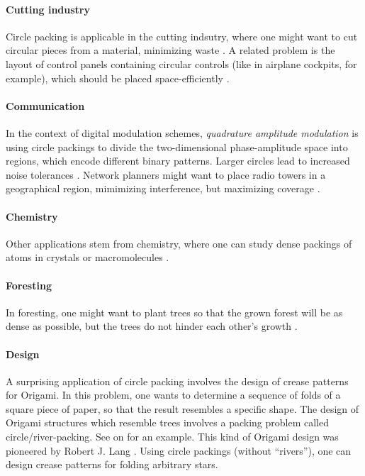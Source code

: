 \documentclass[a4paper,style=print,bibliography=totoc,nexus,lnum,extramargin]{tubsbook}
\begin{document}
\paragraph{Cutting industry}

Circle packing is applicable in the cutting indsutry, where one might want to cut circular pieces from a material, minimizing waste \cite{SMCSCG2007new}.
A related problem is the layout of control panels containing circular controls (like in airplane cockpits, for example), which should be placed space-efficiently \parencite{CKP2008solving}.

\paragraph{Communication}

In the context of digital modulation schemes, \emph{quadrature amplitude modulation} is using circle packings to divide the two-dimensional phase-amplitude space into regions, which encode different binary patterns. Larger circles lead to increased noise tolerances \parencite{PWMD1992packing}.
Network planners might want to place radio towers in a geographical region, mimimizing interference, but maximizing coverage \parencite{SMCSCG2007new}.

\paragraph{Chemistry}

Other applications stem from chemistry, where one can study dense packings of atoms in crystals or macromolecules \cite{WMP1994history}.

\paragraph{Foresting}

In foresting, one might want to plant trees so that the grown forest will be as dense as possible, but the trees do not hinder each other's growth \cite{SMCSCG2007new}.

\paragraph{Design}

A surprising application of circle packing involves the design of crease patterns for Origami. In this problem, one wants to determine a sequence of folds of a square piece of paper, so that the result resembles a specific shape. The design of Origami structures which resemble trees involves a packing problem called circle/river-packing. See  on  for an example. This kind of Origami design was pioneered by Robert J. Lang \cite{lang1996computational}. Using circle packings (without “rivers”), one can design crease patterns for folding arbitrary stars.
\end{document}
